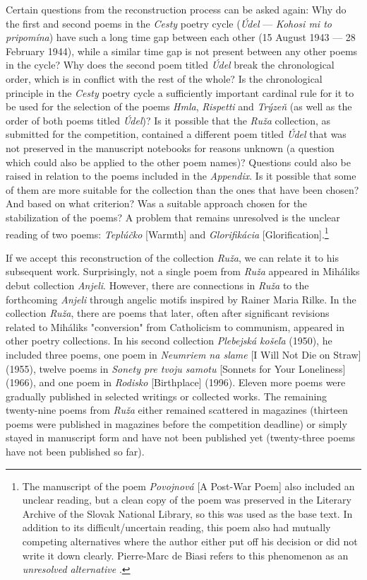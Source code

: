 \documentclass{article}
\begin{document}
Certain questions from the reconstruction process can be asked again:
Why do the first and second poems in the \emph{Cesty} poetry cycle
(\emph{Údel} –– \emph{Kohosi mi to pripomína}) have such a long time gap
between each other (15 August 1943 –– 28 February 1944), while a similar
time gap is not present between any other poems in the cycle? Why does
the second poem titled \emph{Údel} break the chronological order, which
is in conflict with the rest of the whole? Is the chronological
principle in the \emph{Cesty} poetry cycle a sufficiently important
cardinal rule for it to be used for the selection of the poems
\emph{Hmla}, \emph{Rispetti} and \emph{Trýzeň} (as well as the order of
both poems titled \emph{Údel})? Is it possible that the \emph{Ruža}
collection, as submitted for the competition, contained a different poem
titled \emph{Údel} that was not preserved in the manuscript notebooks
for reasons unknown (a question which could also be applied to the other
poem names)? Questions could also be raised in relation to the poems
included in the \emph{Appendix}. Is it possible that some of them are
more suitable for the collection than the ones that have been chosen?
And based on what criterion? Was a suitable approach chosen for the
stabilization of the poems? A problem that remains unresolved is the
unclear reading of two poems: \emph{Teplúčko} [Warmth] and
\emph{Glorifikácia} [Glorification].\footnote{The manuscript of the poem
  \emph{Povojnová} [A Post-War Poem] also included an unclear reading,
  but a clean copy of the poem was preserved in the Literary Archive of
  the Slovak National Library, so this was used as the base text. In
  addition to its difficult/uncertain reading, this poem also had
  mutually competing alternatives where the author either put off his
  decision or did not write it down clearly. Pierre-Marc de Biasi refers
  to this phenomenon as an \emph{unresolved alternative} \citep[77]{de_biasi_textova_2018}.}

If we accept this reconstruction of the collection \emph{Ruža}, we can
relate it to his subsequent work. Surprisingly, not a single poem from
\emph{Ruža} appeared in Mihálik\textquotesingle s debut collection
\emph{Anjeli}. However, there are connections in \emph{Ruža} to the
forthcoming \emph{Anjeli} through angelic motifs inspired by Rainer
Maria Rilke. In the collection \emph{Ruža}, there are poems that later,
often after significant revisions related to Mihálik\textquotesingle s
"conversion" from Catholicism to communism, appeared in other poetry
collections. In his second collection \emph{Plebejská košeľa} (1950), he
included three poems, one poem in \emph{Neumriem na slame} [I Will Not
Die on Straw] (1955), twelve poems in \emph{Sonety pre tvoju samotu}
[Sonnets for Your Loneliness] (1966), and one poem in \emph{Rodisko}
[Birthplace] (1996). Eleven more poems were gradually published in
selected writings or collected works. The remaining twenty-nine poems
from \emph{Ruža} either remained scattered in magazines (thirteen poems
were published in magazines before the competition deadline) or simply
stayed in manuscript form and have not been published yet (twenty-three
poems have not been published so far).
\end{document}

